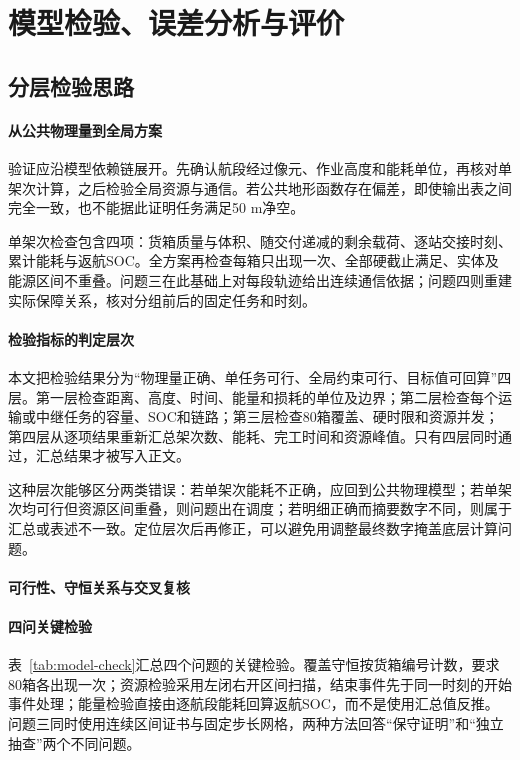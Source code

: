 \section{模型检验、误差分析与评价}
\subsection{分层检验思路}
\paragraph{从公共物理量到全局方案}
验证应沿模型依赖链展开。先确认航段经过像元、作业高度和能耗单位，再核对单架次计算，之后检验全局资源与通信。若公共地形函数存在偏差，即使输出表之间完全一致，也不能据此证明任务满足50 m净空。

单架次检查包含四项：货箱质量与体积、随交付递减的剩余载荷、逐站交接时刻、累计能耗与返航SOC。全方案再检查每箱只出现一次、全部硬截止满足、实体及能源区间不重叠。问题三在此基础上对每段轨迹给出连续通信依据；问题四则重建实际保障关系，核对分组前后的固定任务和时刻。

\paragraph{检验指标的判定层次}
本文把检验结果分为“物理量正确、单任务可行、全局约束可行、目标值可回算”四层。第一层检查距离、高度、时间、能量和损耗的单位及边界；第二层检查每个运输或中继任务的容量、SOC和链路；第三层检查80箱覆盖、硬时限和资源并发；第四层从逐项结果重新汇总架次数、能耗、完工时间和资源峰值。只有四层同时通过，汇总结果才被写入正文。

这种层次能够区分两类错误：若单架次能耗不正确，应回到公共物理模型；若单架次均可行但资源区间重叠，则问题出在调度；若明细正确而摘要数字不同，则属于汇总或表述不一致。定位层次后再修正，可以避免用调整最终数字掩盖底层计算问题。

\paragraph{可行性、守恒关系与交叉复核}
\paragraph{四问关键检验}
表~\ref{tab:model-check}汇总四个问题的关键检验。覆盖守恒按货箱编号计数，要求80箱各出现一次；资源检验采用左闭右开区间扫描，结束事件先于同一时刻的开始事件处理；能量检验直接由逐航段能耗回算返航SOC，而不是使用汇总值反推。问题三同时使用连续区间证书与固定步长网格，两种方法回答“保守证明”和“独立抽查”两个不同问题。


